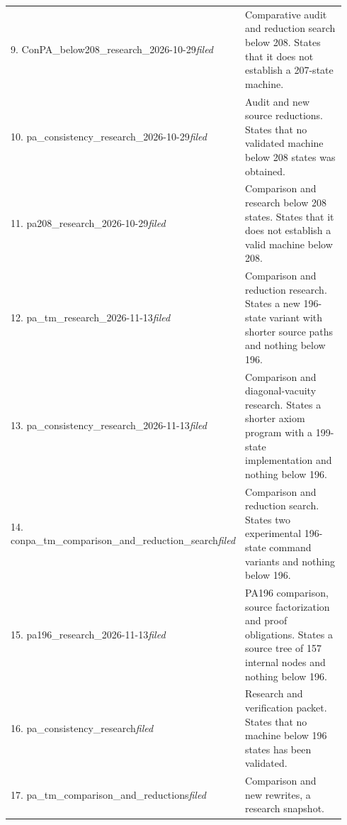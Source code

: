 \begin{longtable}{@{}p{0.43\linewidth}p{0.51\linewidth}@{}}
9. ConPA\_\allowbreak{}below208\_\allowbreak{}research\_\allowbreak{}2026-10-29\newline\emph{filed} & Comparative audit and reduction search below 208. States that it does not establish a 207-state machine.\\[5pt]
10. pa\_\allowbreak{}consistency\_\allowbreak{}research\_\allowbreak{}2026-10-29\newline\emph{filed} & Audit and new source reductions. States that no validated machine below 208 states was obtained.\\[5pt]
11. pa208\_\allowbreak{}research\_\allowbreak{}2026-10-29\newline\emph{filed} & Comparison and research below 208 states. States that it does not establish a valid machine below 208.\\[5pt]
12. pa\_\allowbreak{}tm\_\allowbreak{}research\_\allowbreak{}2026-11-13\newline\emph{filed} & Comparison and reduction research. States a new 196-state variant with shorter source paths and nothing below 196.\\[5pt]
13. pa\_\allowbreak{}consistency\_\allowbreak{}research\_\allowbreak{}2026-11-13\newline\emph{filed} & Comparison and diagonal-vacuity research. States a shorter axiom program with a 199-state implementation and nothing below 196.\\[5pt]
14. conpa\_\allowbreak{}tm\_\allowbreak{}comparison\_\allowbreak{}and\_\allowbreak{}reduction\_\allowbreak{}search\newline\emph{filed} & Comparison and reduction search. States two experimental 196-state command variants and nothing below 196.\\[5pt]
15. pa196\_\allowbreak{}research\_\allowbreak{}2026-11-13\newline\emph{filed} & PA196 comparison, source factorization and proof obligations. States a source tree of 157 internal nodes and nothing below 196.\\[5pt]
16. pa\_\allowbreak{}consistency\_\allowbreak{}research\newline\emph{filed} & Research and verification packet. States that no machine below 196 states has been validated.\\[5pt]
17. pa\_\allowbreak{}tm\_\allowbreak{}comparison\_\allowbreak{}and\_\allowbreak{}reductions\newline\emph{filed} & Comparison and new rewrites, a research snapshot.\\[5pt]

\end{longtable}
